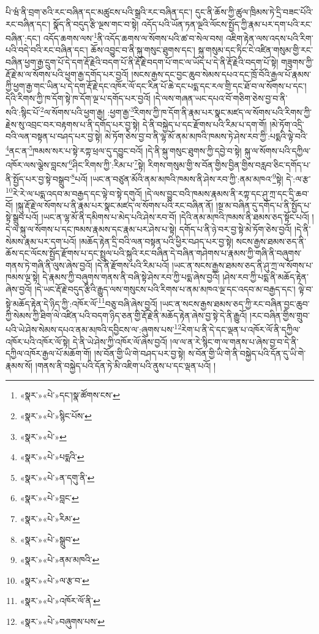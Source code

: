 པི་ཝཾ་ནི་བྲག་ཅའི་རང་བཞིན་དང་མཚུངས་པའི་སྒྲའི་རང་བཞིན་དང་། དུང་ནི་ཆོས་ཀྱི་ཚུལ་ཁྲིམས་ཏེ་དྲི་བཟང་པོའི་རང་བཞིན་དང་། སྣོད་ནི་བདུད་རྩི་ལྔས་གང་བ་སྟེ། འདོད་པའི་ཡོན་ཏན་ལྔའི་ལོངས་སྤྱོད་ཀྱི་རྣམ་པར་དག་པའི་རང་བཞིན་:དང་། འདོད་ཆགས་ལས་\footnote{«སྣར་»«པེ་»དང་།སྣ་ཚོགས་ངས་}ནི་འདོད་ཆགས་ལ་སོགས་པའི་ཚ་བ་སེལ་བས། འཇིག་རྟེན་ལས་འདས་པའི་རིག་པའི་བདེ་བའི་རང་བཞིན་དང་། ཆོས་འབྱུང་བ་ནི་སྐུ་གསུང་ཐུགས་དང་། སྐུ་གསུམ་དང་ཏིང་ངེ་འཛིན་གསུམ་གྱི་རང་བཞིན་ཕྱག་རྒྱ་དྲུག་པོ་དེ་དག་རྡོ་རྗེའི་བདག་པོ་ནི་རྡོ་རྗེ་བདག་པོ་གང་ལ་ཡོད་པ་དེ་ནི་རྡོ་རྗེའི་བདག་པོ་སྟེ། གཟུགས་ཀྱི་རྡོ་རྗེ་མ་ལ་སོགས་པའི་ཕྱག་རྒྱ་དགོད་པར་བྱའོ། །སངས་རྒྱས་དང་བྱང་ཆུབ་སེམས་དཔའ་དང་ཁྲོ་བོའི་རྒྱལ་པོ་རྣམས་ཀྱི་ཕྱག་རྒྱ་གང་ཡིན་པ་དེ་དག་རྡོ་རྗེ་དང་འཁོར་ལོ་དང་རིན་པོ་ཆེ་དང་པདྨ་དང་རལ་གྲི་དང་ཐོ་བ་ལ་སོགས་པ་དང་། དེའི་རིགས་ཀྱི་ཁ་དོག་སྟེ་ཁ་དོག་ལྔ་པ་དགོད་པར་བྱའོ། །དེ་ལས་གཞན་ཡང་དཔའ་བོ་གཅིག་ཅེས་བྱ་བ་ནི་སའི་:སྙིང་པོ་\footnote{«སྣར་»«པེ་»སྙིང་པོས་}ལ་སོགས་པའི་ཕྱག་རྒྱ། :ཕྱག་རྒྱ་\footnote{«སྣར་»«པེ་»}རིགས་ཀྱི་ཁ་དོག་ནི་རྣམ་པར་སྣང་མཛད་ལ་སོགས་པའི་རིགས་ཀྱི་རྗེས་སུ་འབྲང་བར་བརྟགས་པ་ནི་དགོད་པར་བྱ་སྟེ། དེ་ནི་བསྐྱེད་པ་དང་རྫོགས་པའི་རིམ་པ་དག་གོ། །མེ་ཏོག་འདྲི་བའི་ལན་བསྟན་པ་བཤད་པར་བྱ་སྟེ། མེ་ཏོག་ཅེས་བྱ་བ་ནི་ལྷ་མོ་ནམ་མཁའི་ཁམས་ཏེ་ཤེས་རབ་ཀྱི་:པདྨའི་ལྟེ་བའི་\footnote{«སྣར་»«པེ་»པདྨའི་}ནང་ན་\footnote{«སྣར་»«པེ་»ན་དགུ་ནི་}ཁམས་སར་པ་སྟེ་རཀྟ་ཕྲལ་དུ་དབྱུང་བའོ། །དེ་ནི་སྐུ་གསུང་ཐུགས་ཀྱི་དབྱེ་བ་སྟེ། སྐུ་ལ་སོགས་པའི་དཀྱིལ་འཁོར་ལས་ལྕེས་བླངས་\footnote{«སྣར་»«པེ་»བླང་}ཤིང་རིགས་ཀྱི་:རིམ་པ་\footnote{«སྣར་»«པེ་»རིམ་}སྟེ། རིགས་གསུམ་གྱི་ས་བོན་གྱིས་བྱིན་གྱིས་བརླབ་ཅིང་དགོད་པ་ནི་སྤྱོད་པར་བྱ་སྟེ་བསྒྲུབ་\footnote{«སྣར་»«པེ་»སྒྲུབ་}པའོ། །ཡང་ན་བཙུན་མོའི་ནམ་མཁའི་ཁམས་ནི་ཤེས་རབ་ཀྱི་:ནམ་མཁའ་\footnote{«སྣར་»«པེ་»ནམ་མཁའི་}སྟེ། དེ་:ལ་རྩ་\footnote{«སྣར་»«པེ་»ལ་རྩ་བ་}རེ་རེ་ལ་པདྨ་འདབ་མ་བརྒྱད་དང་ལྟེ་བ་སྟེ་དགུའོ། །དེ་ལས་བྱུང་བའི་ཁམས་རྣམས་ནི་རཀྟ་དང་ཤུ་ཀྲ་དང་དྲི་ཆབ་བོ། །སྐུ་རྡོ་རྗེ་ལ་སོགས་པ་ནི་རྣམ་པར་སྣང་མཛད་ལ་སོགས་པའི་རང་བཞིན་ནོ། །སྔ་མ་བཞིན་དུ་དགོད་པ་ནི་སྤྱོད་པ་སྟེ་སྒྲུབ་པའོ། །ཡང་ན་ལྷ་མོ་ནི་དམིགས་པ་མེད་པའི་ཤེས་རབ་བོ། །དེའི་ནམ་མཁའི་ཁམས་ནི་ཐམས་ཅད་སྟོང་པའོ། །དེ་ལ་སྐུ་ལ་སོགས་པ་དང་ཁམས་རྣམས་དང་རྣམ་པར་ཤེས་པ་སྟེ། དགོད་པ་ནི་ཉེ་བར་བྱ་སྟེ་མེ་ཏོག་ཅེས་བྱའོ། །དེ་ནི་སེམས་རྣམ་པར་དག་པའོ། །མཆོད་རྟེན་དྲི་བའི་ལན་བསྟན་པའི་ཕྱིར་བཤད་པར་བྱ་སྟེ། སངས་རྒྱས་ཐམས་ཅད་ནི་ཆོས་དང་ལོངས་སྤྱོད་རྫོགས་པ་དང་སྤྲུལ་པའི་སྐུའི་རང་བཞིན་དེ་བཞིན་གཤེགས་པ་རྣམས་ཀྱི་གཞི་ནི་བཞུགས་གནས་ཏེ་གཞི་ནི་ལུས་ཞེས་བྱའོ། །དེ་ནི་རྫོགས་པའི་རིམ་པའོ། །ཡང་ན་སངས་རྒྱས་ཐམས་ཅད་ནི་ཤུ་ཀྲ་ལ་སོགས་པ་ཁམས་ལྔ་སྟེ། དེ་རྣམས་ཀྱི་བཞུགས་གནས་ནི་བཞི་སྟེ་ཤེས་རབ་ཀྱི་པདྨ་ཞེས་བྱའོ། །ཤེས་རབ་ཀྱི་པདྨ་ནི་མཆོད་རྟེན་ཞེས་བྱའོ། །དེ་ཡང་རྡོ་རྗེ་བདུད་རྩིའི་རྒྱུད་ལས་གསུངས་པའི་རིགས་པ་ནམ་མཁའ་ལྔ་དང་འདབ་མ་བརྒྱད་དང་། ལྟེ་བ་སྟེ་མཆོད་རྟེན་དེ་ཉིད་ཀྱི་:འཁོར་ལོ་\footnote{«སྣར་»«པེ་»འཁོར་ལོ་ནི་}བཅུ་བཞི་ཞེས་བྱའོ། །ཡང་ན་སངས་རྒྱས་ཐམས་ཅད་ཀྱི་རང་བཞིན་བྱང་ཆུབ་ཀྱི་སེམས་ཀྱི་ཐིག་ལེ་འཛིན་པའི་བདག་ཉིད་ཅན་གྱི་རྡོ་རྗེ་ནི་མཆོད་རྟེན་ཞེས་བྱ་སྟེ་དེ་ནི་རྒྱུའོ། །རང་བཞིན་གྱིས་གྲུབ་པའི་ཡེ་ཤེས་སེམས་དཔའ་ནམ་མཁའི་དབྱིངས་ལ་:ཞུགས་པས་\footnote{«སྣར་»«པེ་»བཞུགས་པས་}རེག་པ་ནི་དེ་དང་ལྡན་པ་འཁོར་ལོ་ནི་དཀྱིལ་འཁོར་པའི་འཁོར་ལོ་སྟེ། དེ་ནི་ཡེ་ཤེས་ཀྱི་འཁོར་ལོ་ཞེས་བྱའོ། །ལ་ལ་ན་རེ་སྙིང་ག་ལ་གནས་པ་ཞེས་བྱ་བ་དེ་ནི་དཀྱིལ་འཁོར་རྒྱལ་པོ་མཆོག་གོ། །ས་བོན་གྱི་ཡི་གེ་བཤད་པར་བྱ་སྟེ། ས་བོན་གྱི་ཡི་གེ་ནི་བསྐྱེད་པའི་དོན་དུ་ཡི་གེ་རྣམས་སོ། །གནས་ནི་བསྐྱེད་པའི་དོན་ཏེ་མི་འཇིག་པའི་ནུས་པ་དང་ལྡན་པའོ། །
